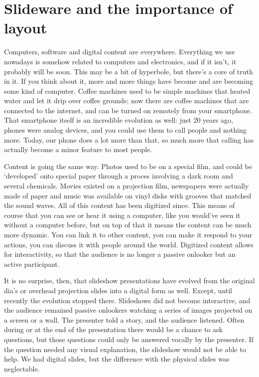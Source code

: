 
 \chapter{Slideware and the importance of layout}

  Computers, software and digital content are everywhere. Everything we use
  nowadays is somehow related to computers and electronics, and if it isn't, it
  probably will be soon. This may be a bit of hyperbole, but there's a core of
  truth in it. If you think about it, more and more things have become and are
  becoming some kind of computer. Coffee machines used to be simple machines
  that heated water and let it drip over coffee grounds; now there are coffee
  machines that are connected to the internet, and can be turned on remotely
  from your smartphone. That smartphone itself is an incredible evolution as
  well: just 20 years ago, phones were analog devices, and you could use them
  to call people and nothing more. Today, our phone does a lot more than that,
  so much more that calling has actually become a minor feature to most people.

  Content is going the same way. Photos used to be on a special film, and could
  be `developed' onto special paper through a proces involving a dark room and
  several chemicals. Movies existed on a projection film, newspapers were
  actually made of paper and music was available on vinyl disks with grooves
  that matched the sound waves. All of this content has been digitized since.
  This means of course that you can see or hear it using a computer, like you
  would've seen it without a computer before, but on top of that it means the
  content can be much more dynamic. You can link it to other content, you can
  make it respond to your actions, you can discuss it with people around the
  world. Digitized content allows for interactivity, so that the audience is no
  longer a passive onlooker but an active participant.

  It is no surprise, then, that slideshow presentations have evolved from the
  original dia's or overhead projection slides into a digital form as well.
  Except, until recently the evolution stopped there. Slideshows did not become
  interactive, and the audience remained passive onlookers watching a series of
  images projected on a screen or a wall. The presenter told a story, and the
  audience listened. Often during or at the end of the presentation there would
  be a chance to ask questions, but those questions could only be answered
  vocally by the presenter. If the question needed any visual explanation, the
  slideshow would not be able to help. We had digital slides, but the
  difference with the physical slides was neglectable.

